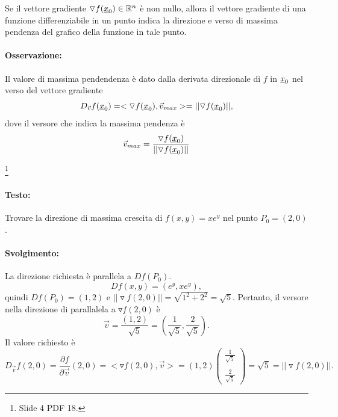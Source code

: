 \begin{proposition}
	Se il vettore gradiente $\triangledown f(\uline x_0)\in\mathbb{R}^n$ è non nullo, allora il vettore gradiente di una funzione differenziabile in un punto indica la direzione e verso di massima pendenza del grafico della funzione in tale punto.
\end{proposition}

\paragraph{Osservazione:} Il valore di massima pendendenza è dato dalla derivata direzionale di $f$ in $\uline x_0$ nel verso del vettore gradiente
\begin{equation*}
	D_{\vec{v}} f(\uline x_0) = <\triangledown f(\uline x_0), \vec{v}_{max}>= ||\triangledown f(\uline x_0)||,
\end{equation*}
dove il versore che indica la massima pendenza è
\begin{equation*}
	\vec{v}_{max} = \frac{\triangledown f(\uline x_0)}{||\triangledown f(\uline x_0)||}
\end{equation*}

\begin{example}\footnote{Slide 4 PDF 18.}
	\paragraph{Testo:} Trovare la direzione di massima crescita di $f(x,y)=xe^y$ nel punto $P_0=(2,0)$.
	\paragraph{Svolgimento:} La direzione richiesta è parallela a $Df(P_0)$.
	\begin{equation*}
		Df(x,y) = (e^y, xe^y),
	\end{equation*}
	quindi $Df(P_0)=(1,2)$ e $||\triangledown f(2,0)||=\sqrt{1^2+2^2} = \sqrt{5}$. Pertanto, il versore nella direzione di parallalela a $\triangledown f(2,0)$ è
	\begin{equation*}
		\vec{v} = \frac{(1,2)}{\sqrt{5}} = \left(\frac{1}{\sqrt{5}},\frac{2}{\sqrt{5}}\right).
	\end{equation*}
	Il valore richiesto è
	\begin{equation*}
		D_{\vec{v}}f(2,0) = \frac{\partial f}{\partial \vec{v}}(2,0)=<\triangledown f(2,0), \vec{v}> = (1,2)
		\begin{pmatrix}
			\frac{1}{\sqrt{5}}\\\\
			\frac{2}{\sqrt{5}}
		\end{pmatrix} = \sqrt{5} = ||\triangledown f(2,0)||.
	\end{equation*}
\end{example}

